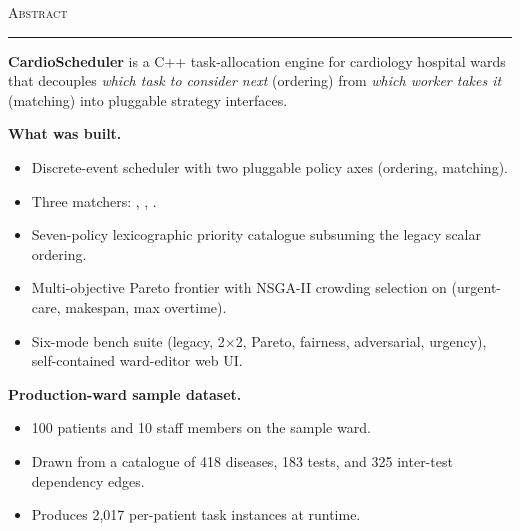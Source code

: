 \vspace*{0.5cm}
\begin{center}
  {\Large\scshape Abstract}\\[0.3em]
  \rule{0.25\textwidth}{0.4pt}
\end{center}
\vspace{0.8em}

\noindent
\textbf{CardioScheduler} is a C++ task-allocation engine for
cardiology hospital wards that decouples \emph{which task to consider next}
(ordering) from \emph{which worker takes it} (matching) into pluggable
strategy interfaces.

\vspace{0.9em}
\noindent\textbf{What was built.}
\begin{itemize}
  \item Discrete-event scheduler with two pluggable policy axes
        (ordering, matching).
  \item Three matchers: , ,
        .
  \item Seven-policy lexicographic priority catalogue subsuming the
        legacy scalar ordering.
  \item Multi-objective Pareto frontier with NSGA-II crowding
        selection on (urgent-care, makespan, max overtime).
  \item Six-mode bench suite (legacy, 2$\times$2, Pareto, fairness,
        adversarial, urgency), self-contained ward-editor web UI.
\end{itemize}

\vspace{0.9em}
\noindent\textbf{Production-ward sample dataset.}
\begin{itemize}
  \item 100 patients and 10 staff members on the sample ward.
  \item Drawn from a catalogue of 418 diseases, 183 tests, and 325
        inter-test dependency edges.
  \item Produces 2{,}017 per-patient task instances at runtime.
\end{itemize}

